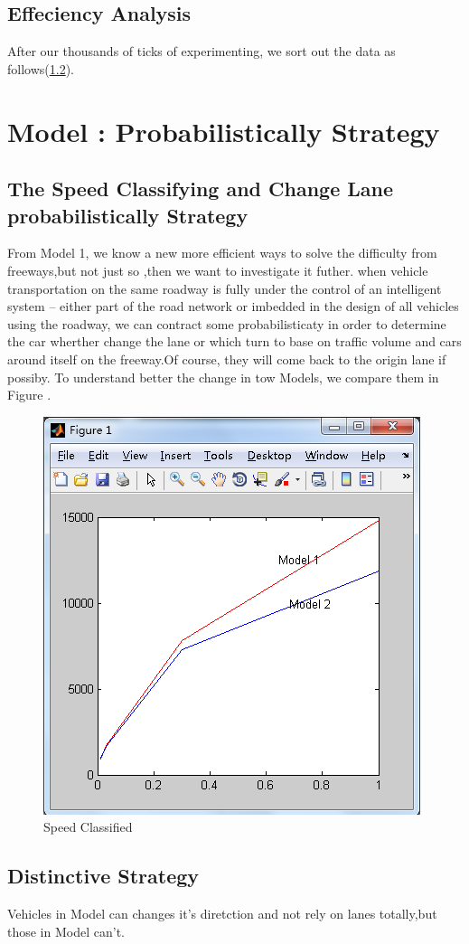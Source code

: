 \subsection{Effeciency Analysis}
After our thousands of ticks of experimenting, we sort out the data as follows(\ref{}). 


\section{Model \uppercase\expandafter{}: Probabilistically Strategy}
\subsection{The Speed Classifying and Change Lane probabilistically Strategy}
From Model 1, we know a new more efficient ways to solve the difficulty from freeways,but not just so ,then we want to investigate it futher. when vehicle transportation on the same roadway is fully under the control of an intelligent system – either part of the road network or imbedded in the design of all vehicles using the roadway, we can contract some probabilisticaty in order to determine the car wherther change the lane or which turn to base on traffic volume and cars around itself on the freeway.Of course, they will come back to the origin lane if possiby. To understand better the change in tow Models, we compare them in Figure \cite{fig:model2}.
\begin{figure}[H]
  \centering
  \includegraphics[width=.6\textwidth]{./img/model2.png}
  \caption{Speed Classified}
  \label{fig:model2}
\end{figure}
\subsection{Distinctive Strategy}
Vehicles in Model \uppercase\expandafter{} can changes it's diretction and not rely on lanes totally,but those in Model \uppercase\expandafter{} can't.

